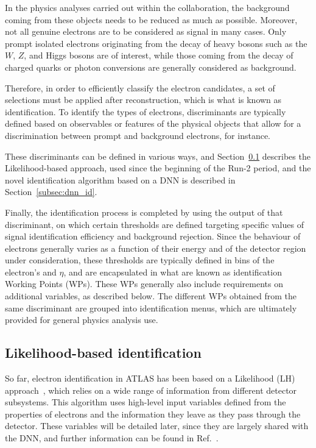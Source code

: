 In the physics analyses carried out within the collaboration, the background coming from these objects needs to be reduced as much as possible. Moreover, not all genuine electrons are to be considered as signal in many cases. Only prompt isolated electrons originating from the decay of heavy bosons such as the $W$, $Z$, and Higgs bosons are of interest, while those coming from the decay of charged quarks or photon conversions are generally considered as background.

Therefore, in order to efficiently classify the electron candidates, a set of selections must be applied after reconstruction, which is what is known as identification. To identify the types of electrons, discriminants are typically defined based on observables or features of the physical objects that allow for a discrimination between prompt and background electrons, for instance.

These discriminants can be defined in various ways, and Section~\ref{LH_identification} describes the Likelihood-based approach, used since the beginning of the Run-2 period, and the novel identification algorithm based on a DNN is described in Section~\ref{subsec:dnn_id}.

Finally, the identification process is completed by using the output of that discriminant, on which certain thresholds are defined targeting specific values of signal identification efficiency and background rejection. Since the behaviour of electrons generally varies as a function of their energy and of the detector region under consideration, these thresholds are typically defined in bins of the electron’s \et and $\eta$, and are encapsulated in what are known as identification Working Points (WPs). These WPs generally also include requirements on additional variables, as described below. The different WPs obtained from the same discriminant are grouped into identification menus, which are ultimately provided for general physics analysis use.

\subsection{Likelihood-based identification}
\label{LH_identification}
So far, electron identification in ATLAS has been based on a Likelihood (LH) approach~\cite{Aad:2684552,Aaboud:2657964}, which relies on a wide range of information from different detector subsystems. This algorithm uses high-level input variables defined from the properties of electrons and the information they leave as they pass through the detector. These variables will be detailed later, since they are largely shared with the DNN, and further information can be found in Ref.~\cite{Aaboud:2657964}.


